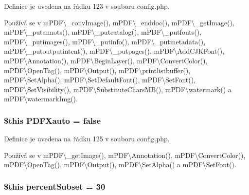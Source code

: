 Definice je uvedena na řádku 123 v souboru config.\-php.



Používá se v m\-P\-D\-F\textbackslash{}\-\_\-conv\-Image(), m\-P\-D\-F\textbackslash{}\-\_\-enddoc(), m\-P\-D\-F\textbackslash{}\-\_\-get\-Image(), m\-P\-D\-F\textbackslash{}\-\_\-putannots(), m\-P\-D\-F\textbackslash{}\-\_\-putcatalog(), m\-P\-D\-F\textbackslash{}\-\_\-putfonts(), m\-P\-D\-F\textbackslash{}\-\_\-putimages(), m\-P\-D\-F\textbackslash{}\-\_\-putinfo(), m\-P\-D\-F\textbackslash{}\-\_\-putmetadata(), m\-P\-D\-F\textbackslash{}\-\_\-putoutputintent(), m\-P\-D\-F\textbackslash{}\-\_\-putpages(), m\-P\-D\-F\textbackslash{}\-Add\-C\-J\-K\-Font(), m\-P\-D\-F\textbackslash{}\-Annotation(), m\-P\-D\-F\textbackslash{}\-Begin\-Layer(), m\-P\-D\-F\textbackslash{}\-Convert\-Color(), m\-P\-D\-F\textbackslash{}\-Open\-Tag(), m\-P\-D\-F\textbackslash{}\-Output(), m\-P\-D\-F\textbackslash{}printlistbuffer(), m\-P\-D\-F\textbackslash{}\-Set\-Alpha(), m\-P\-D\-F\textbackslash{}\-Set\-Default\-Font(), m\-P\-D\-F\textbackslash{}\-Set\-Font(), m\-P\-D\-F\textbackslash{}\-Set\-Visibility(), m\-P\-D\-F\textbackslash{}\-Substitute\-Chars\-M\-B(), m\-P\-D\-F\textbackslash{}watermark() a m\-P\-D\-F\textbackslash{}watermark\-Img().

\hypertarget{config_8php_a914b8ce8d1d0ca875423412ba468b1d2}{
\subsubsection[{P\-D\-F\-Xauto}]{\setlength{\rightskip}{0pt plus 5cm}\$this P\-D\-F\-Xauto = {\bf false}}}\label{config_8php_a914b8ce8d1d0ca875423412ba468b1d2}


Definice je uvedena na řádku 125 v souboru config.\-php.



Používá se v m\-P\-D\-F\textbackslash{}\-\_\-get\-Image(), m\-P\-D\-F\textbackslash{}\-Annotation(), m\-P\-D\-F\textbackslash{}\-Convert\-Color(), m\-P\-D\-F\textbackslash{}\-Open\-Tag(), m\-P\-D\-F\textbackslash{}\-Output(), m\-P\-D\-F\textbackslash{}\-Set\-Alpha() a m\-P\-D\-F\textbackslash{}\-Set\-Font().

\hypertarget{config_8php_a467058bbbf9bdf611a12b1f3f174a8a5}{
\subsubsection[{percent\-Subset}]{\setlength{\rightskip}{0pt plus 5cm}\$this percent\-Subset = 30}}\label{config_8php_a467058bbbf9bdf611a12b1f3f174a8a5}


